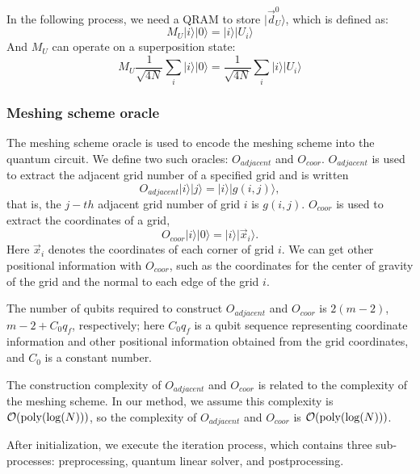 \documentclass[%
 reprint,
 amsmath,amssymb,
pra,
]{revtex4-1}
\begin{document}
In the following process, we need a QRAM to store $|\vec{d}_U^0\rangle$, which is defined as:
\begin{equation}
M_U|i\rangle|0\rangle=|i\rangle|U_i\rangle
\end{equation}
And $M_U$ can operate on a superposition state:
\begin{equation}
M_U\frac{1}{\sqrt{4N}}\sum_i{|i\rangle|0\rangle}=\frac{1}{\sqrt{4N}}\sum_i{|i\rangle|U_i\rangle}
\end{equation}

\subsubsection{Meshing scheme oracle}

The meshing scheme oracle is used to encode the meshing scheme into the quantum circuit. We define two such oracles: $O_{adjacent}$ and $O_{coor}$. $O_{adjacent}$ is used to extract the adjacent grid number of a specified grid and is written
\begin{equation}
O_{adjacent}|i\rangle|j\rangle=|i\rangle|g(i,j)\rangle,
\end{equation}
that is, the $j-th$ adjacent grid number of grid $i$ is $g(i,j)$. $O_{coor}$ is used to extract the coordinates of a grid,
\begin{equation}
O_{coor}|i\rangle|0\rangle=|i\rangle|\vec{x}_i\rangle.
\end{equation}
Here $\vec{x}_i$ denotes the coordinates of each corner of grid $i$. We can get other positional information with $O_{coor}$, such as the coordinates for the center of gravity of the grid and the normal to each edge of the grid $i$.

The number of qubits required to construct $O_{adjacent}$ and $O_{coor}$ is $2(m-2)$, $m-2+C_0q_f$, respectively; here $C_0q_f$ is a qubit sequence representing coordinate information and other positional information obtained from the grid coordinates, and $C_0$ is a constant number.

The construction complexity of $O_{adjacent}$ and $O_{coor}$ is related to the complexity of the meshing scheme. In our method, we assume this complexity is $\mathcal{O}({\rm poly}(\log(N)))$, so the complexity of $O_{adjacent}$ and $O_{coor}$ is $\mathcal{O}({\rm poly}(\log(N)))$. 

After initialization, we execute the iteration process, which contains three sub-processes: preprocessing, quantum linear solver, and postprocessing.
\end{document}
